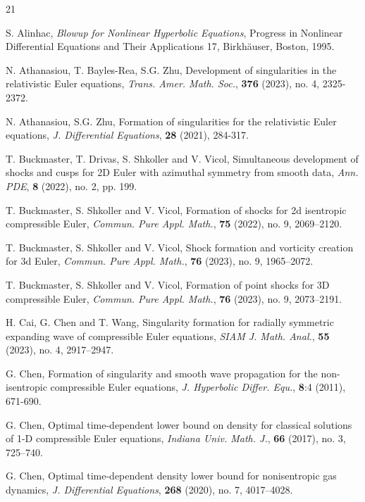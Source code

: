 \documentclass[11pt,reqno]{article}
\numberwithin{equation}{section}
\begin{document}
\begin{thebibliography}{21}
\addtolength{\itemsep}{-0.5em}

 S. Alinhac, \emph{Blowup for Nonlinear Hyperbolic Equations}, Progress in Nonlinear
    Differential Equations and Their Applications 17, Birkh\"auser, Boston, 1995.

 N. Athanasiou, T. Bayles-Rea, S.G. Zhu, Development of singularities in the relativistic Euler equations, \emph{Trans. Amer. Math. Soc.}, {\bf 376} (2023), no. 4, 2325-2372.

 N. Athanasiou, S.G. Zhu, Formation of singularities for the relativistic Euler equations, \emph{J. Differential Equations}, {\bf 28} (2021), 284-317.

 T. Buckmaster, T. Drivas, S. Shkoller and V. Vicol, Simultaneous development of
    shocks and cusps for 2D Euler with azimuthal symmetry from smooth data, \emph{Ann. PDE}, {\bf 8} (2022), no. 2, pp. 199.

 T. Buckmaster, S. Shkoller and V. Vicol, Formation of shocks for 2d isentropic
    compressible Euler, \emph{Commun. Pure Appl. Math.}, {\bf 75} (2022), no. 9, 2069--2120.

 T. Buckmaster, S. Shkoller and V. Vicol, Shock formation and vorticity creation for
    3d Euler, \emph{Commun. Pure Appl. Math.}, {\bf 76} (2023), no. 9, 1965--2072.

 T. Buckmaster, S. Shkoller and V. Vicol, Formation of point shocks for 3D
    compressible Euler, \emph{Commun. Pure Appl. Math.}, {\bf 76} (2023), no. 9, 2073--2191.

 H. Cai, G. Chen and T. Wang, Singularity formation for radially symmetric
    expanding wave of compressible Euler equations, \emph{SIAM J. Math. Anal.}, {\bf 55} (2023), no.
    4, 2917--2947.

  G. Chen,
{Formation of singularity and smooth wave propagation for the
non-isentropic compressible Euler
equations}, {\em J. Hyperbolic Differ. Equ.}, {\bf8}:4 (2011), 671-690.

 G. Chen, Optimal time-dependent lower bound on density for
classical solutions of 1-D compressible Euler equations, \emph{Indiana Univ. Math. J.}, {\bf 66}
(2017), no. 3, 725--740.

 G. Chen, Optimal time-dependent density lower bound for nonisentropic gas dynamics,
    \emph{J. Differential Equations}, {\bf 268} (2020), no. 7, 4017--4028.


\end{thebibliography}
\end{document}
